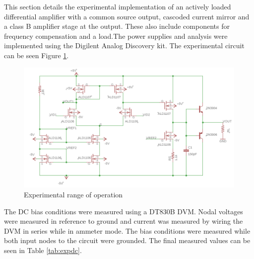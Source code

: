 
	
	
	
		
		
		
	This section details the experimental implementation of an actively loaded differential amplifier with a common source output, cascoded current mirror and a class B amplifier stage at the output. These also include components for frequency compensation and a load.The power supplies and analysis were implemented using the Digilent Analog Discovery kit. The experimental circuit can be seen Figure \ref{fig:expercircuit}.
		
		
				
		\begin{figure}[H]
			\begin{center}
				\includegraphics[scale=.40]{ExperimentalImplementation/expschem.png}
				\caption{Experimental range of operation}
				\label{fig:expercircuit}
			\end{center}
		\end{figure}

	
	The DC bias conditions were measured using a DT830B DVM. Nodal voltages were measured in reference to ground and current was measured by wiring the DVM in series while in ammeter mode. The bias conditions were measured while both input nodes to the circuit were grounded. The final measured values can be seen in Table \ref{tab:expdc}.
		
